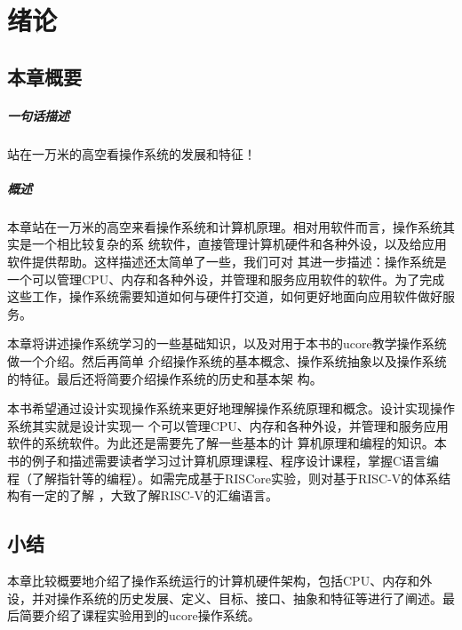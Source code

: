 
\chapter{绪论}\label{ch_intro}

\section{本章概要}

\paragraph{一句话描述}

站在一万米的高空看操作系统的发展和特征！

\paragraph{概述}

本章站在一万米的高空来看操作系统和计算机原理。相对用软件而言，操作系统其实是一个相比较复杂的系
统软件，直接管理计算机硬件和各种外设，以及给应用软件提供帮助。这样描述还太简单了一些，我们可对
其进一步描述：操作系统是一个可以管理CPU、内存和各种外设，并管理和服务应用软件的软件。为了完成
这些工作，操作系统需要知道如何与硬件打交道，如何更好地面向应用软件做好服务。

本章将讲述操作系统学习的一些基础知识，以及对用于本书的ucore教学操作系统做一个介绍。然后再简单
介绍操作系统的基本概念、操作系统抽象以及操作系统的特征。最后还将简要介绍操作系统的历史和基本架
构。

本书希望通过设计实现操作系统来更好地理解操作系统原理和概念。设计实现操作系统其实就是设计实现一
个可以管理CPU、内存和各种外设，并管理和服务应用软件的系统软件。为此还是需要先了解一些基本的计
算机原理和编程的知识。本书的例子和描述需要读者学习过计算机原理课程、程序设计课程，掌握C语言编
程（了解指针等的编程）。如需完成基于RISCore实验，则对基于RISC-V的体系结构有一定的了解
，大致了解RISC-V的汇编语言。

%




\section{小结}
本章比较概要地介绍了操作系统运行的计算机硬件架构，包括CPU、内存和外设，并对操作系统的历史发展、定义、目标、接口、抽象和特征等进行了阐述。最后简要介绍了课程实验用到的ucore操作系统。